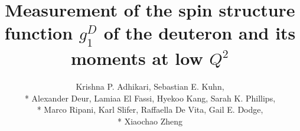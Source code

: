 \documentclass[12pt,epsfig]{report}
\begin{document}
\title{Measurement of the spin structure function $g^D_{1}$ of the deuteron and its moments at low $Q^2$}   
\author{Krishna P. Adhikari, Sebastian E. Kuhn, \\*
Alexander Deur, Lamiaa El Fassi, Hyekoo Kang, Sarah K. Phillips, \\* %
Marco Ripani, Karl Slifer, Raffaella De Vita, Gail E. Dodge, \\*
 Xiaochao Zheng}

\maketitle

\begin{comment} %
\end{comment} %


\tableofcontents
\begin{comment} %
\listoffigures
\listoftables
\end{comment} %



%












\begin{comment} %







\end{comment} %



\begin{comment} %


\end{comment} %
\end{document}
